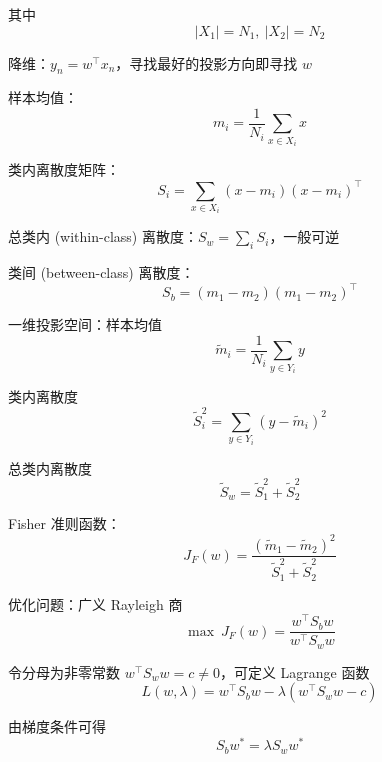 \documentclass[openany]{ctexbook}
\theoremstyle{kaiti}
\theoremstyle{normal}
\begin{document}
其中
\begin{equation}
|X_1|=N_1,~|X_2|=N_2
\end{equation}

降维：$y_n=w^{\top}x_n$，寻找最好的投影方向即寻找 $w$

样本均值：
\begin{equation}
m_i=\frac{1}{N_i}\sum_{x\in X_i}x
\end{equation}

类内离散度矩阵：
\begin{equation}
S_i=\sum_{x\in X_i}\left(x-m_i \right)\left(x-m_i \right)^{\top}
\end{equation}

总类内 (within-class) 离散度：$S_w=\sum_iS_i$，一般可逆

类间 (between-class) 离散度：
\begin{equation}
S_b=\left(m_1-m_2 \right)\left(m_1-m_2 \right)^{\top}
\end{equation}

一维投影空间：样本均值
\begin{equation}
\tilde{m}_i=\frac{1}{N_i}\sum_{y\in Y_i}y
\end{equation}

类内离散度
\begin{equation}
\tilde{S}_{i}^{2}=\sum_{y\in Y_i}\left(y-\tilde{m}_i \right)^2
\end{equation}

总类内离散度
\begin{equation}
\tilde{S}_w=\tilde{S}_{1}^{2}+\tilde{S}_{2}^{2}
\end{equation}

Fisher 准则函数：
\begin{equation}
J_F\left(w \right)=\frac{\left(\tilde{m}_1-\tilde{m}_2 \right)^2}{\tilde{S}_{1}^{2}+\tilde{S}_{2}^{2}}
\end{equation}

优化问题：广义 Rayleigh 商
\begin{equation}
\max~J_F\left(w \right)=\frac{w^{\top}S_bw}{w^{\top}S_ww}
\end{equation}

令分母为非零常数 $w^{\top}S_ww=c\ne 0$，可定义 Lagrange 函数
\begin{equation}
L\left(w,\lambda \right)=w^{\top}S_bw-\lambda \left(w^{\top}S_ww-c \right)
\end{equation}

由梯度条件可得
\begin{equation}
S_bw^*=\lambda S_ww^*
\end{equation}
\end{document}
